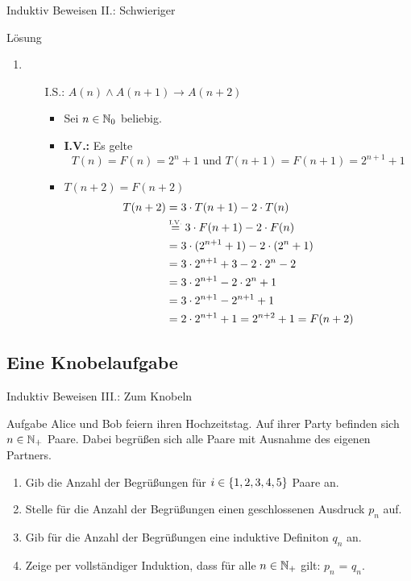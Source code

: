\begin{frame}{Induktiv Beweisen II.: Schwieriger}
	\begin{block}{Lösung}
	\begin{enumerate}
		\setcounter{enumi}{\value{kevin}}
		\item
		\begin{itemize}
				\item[I.S.:] $A(n) \wedge A(n+1) \rightarrow A(n+2)$ %
					\begin{itemize}
						\item Sei $n \in \mathbb{N}_{0}$ beliebig.
						\item \textbf{I.V.:} Es gelte
				 					\[T(n)=F(n)=2^n+1 \text{ und } T(n+1)=F(n+1)=2^{n+1}+1\]
				 		\item \zz $T(n+2) = F(n+2)$
				 		\begin{align*}
							T(n+2) &= 3 \cdot T(n+1) - 2 \cdot T(n) \\
								   &\eqtext{I.V.} 3 \cdot F(n+1) - 2 \cdot F(n) \\
								   &= 3 \cdot (2^{n+1}+1) - 2 \cdot (2^n+1) \\
								   &= 3 \cdot 2^{n+1} + 3 - 2 \cdot 2^n - 2 \\
								   &= 3 \cdot 2^{n+1} - 2 \cdot 2^n + 1 \\
								   &= 3 \cdot 2^{n+1} - 2^{n+1} +1 \\
								   &= 2 \cdot 2^{n+1} + 1 = 2^{n+2} + 1 = F(n+2)
						\end{align*}
					\end{itemize}				
			\end{itemize}
		\end{enumerate}
	\end{block}
\end{frame}
\subsection{Eine Knobelaufgabe}
\begin{frame}{Induktiv Beweisen III.: Zum Knobeln}
	\begin{exampleblock}{Aufgabe}
		Alice und Bob feiern ihren Hochzeitstag. Auf ihrer Party befinden sich $n \in \mathbb{N}_+$ Paare. Dabei begrüßen sich alle Paare mit Ausnahme des eigenen Partners.\\
		\begin{enumerate}
			\item Gib die Anzahl der Begrüßungen für $i \in \left\{ 1,2,3,4,5 \right\}$ Paare an.
			\item Stelle für die Anzahl der Begrüßungen einen geschlossenen Ausdruck $p_n$ auf.
			\item Gib für die Anzahl der Begrüßungen eine induktive Definiton $q_n$ an.
			\item Zeige per vollständiger Induktion, dass für alle $n \in \mathbb{N}_+$ gilt: $p_n$ = $q_n$.
		\end{enumerate}
	\end{exampleblock}
\end{frame}

